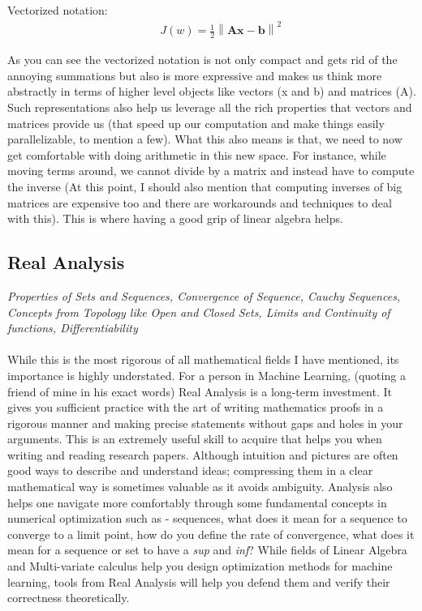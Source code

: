 \documentclass[a4paper]{article}
\begin{document}
Vectorized notation:
\begin{equation} \label{eq:5}
\begin{aligned}
& & J(w) = \frac{1}{2} \left\lVert \mathbf{A} \boldsymbol{x} - \boldsymbol{b} \right\rVert ^2
\end{aligned}
\end{equation}

\noindent As you can see the vectorized notation is not only compact and gets rid of the annoying summations but also is more expressive and makes us think more abstractly in terms of higher level objects like vectors (x and b) and matrices (A). Such representations also help us leverage all the rich properties that vectors and matrices provide us (that speed up our computation and make things easily parallelizable, to mention a few). What this also means is that, we need to now get comfortable with doing arithmetic in this new space. For instance, while moving terms around, we cannot divide by a matrix and instead have to compute the inverse (At this point, I should also mention that computing inverses of big matrices are expensive too and there are workarounds and techniques to deal with this). This is where having a good grip of linear algebra helps. \\

\subsection{Real Analysis}
\textit{Properties of Sets and Sequences, Convergence of Sequence, Cauchy Sequences, Concepts from Topology like Open and Closed Sets, Limits and Continuity of functions, Differentiability} \\ \\
While this is the most rigorous of all mathematical fields I have mentioned, its importance is highly understated. For a person in Machine Learning, (quoting a friend of mine in his exact words) Real Analysis is a long-term investment. It gives you sufficient practice with the art of writing mathematics proofs in a rigorous manner and making precise statements without gaps and holes in your arguments. This is an extremely useful skill to acquire that helps you when writing and reading research papers. Although intuition and pictures are often good ways to describe and understand ideas; compressing them in a clear mathematical way is sometimes valuable as it avoids ambiguity. Analysis also helps one navigate more comfortably through some fundamental concepts in numerical optimization such as - sequences, what does it mean for a sequence to converge to a limit point, how do you define the rate of convergence, what does it mean for a sequence or set to have a \textit{sup} and \textit{inf}? While fields of Linear Algebra and Multi-variate calculus help you design optimization methods for machine learning, tools from Real Analysis will help you defend them and verify their correctness theoretically. \\
\end{document}
